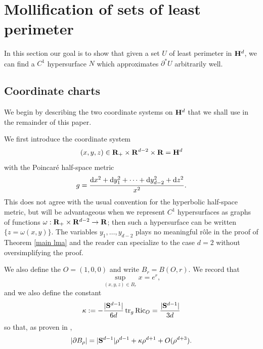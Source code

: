 \section{Mollification of sets of least perimeter}\label{MollifierSection}
In this section our goal is to show that given a set $U$ of least perimeter in $\mathbf H^d$, we can find a $C^1$ hypersurface $N$ which approximates $\partial^* U$ arbitrarily well.

\subsection{Coordinate charts}
We begin by describing the two coordinate systems on $\mathbf H^d$ that we shall use in the remainder of this paper.

We first introduce the coordinate system
$$(x, y, z) \in \mathbf{R}_+ \times \mathbf{R}^{d - 2} \times \mathbf{R} = \mathbf H^d$$
with the Poincar\'e half-space metric
\begin{equation}\label{hyperbolic metric}
g = \frac{\mathop{}\!\mathrm{d} x^2 + \mathop{}\!\mathrm{d} y_1^2 + \cdots + \mathop{}\!\mathrm{d} y_{d - 2}^2 + \mathop{}\!\mathrm{d} z^2}{x^2}.
\end{equation}
This does not agree with the usual convention for the hyperbolic half-space metric, but will be advantageous when we represent $C^1$ hypersurfaces as graphs of functions $\omega: \mathbf{R}_+ \times \mathbf{R}^{d - 2} \to \mathbf{R}$; then such a hypersurface can be written $\{z = \omega(x, y)\}$.
The variables $y_1, \dots, y_{d - 2}$ plays no meaningful r\^ole in the proof of Theorem \ref{main lma} and the reader can specialize to the case $d = 2$ without oversimplifying the proof.

We also define the  $O = (1, 0, 0)$ and write $B_r = B(O, r)$.
We record that
\begin{equation}\label{sup in a ball}
\sup_{(x, y, z) \in B_r} x = e^r,
\end{equation}
and we also define the constant
$$\kappa := -\frac{|\mathbf S^{d - 1}|}{6d} \operatorname{tr}_g \mathrm{Ric}_O = \frac{|\mathbf S^{d - 1}|}{3d}$$
so that, as proven in \cite{gray1974volume},
\begin{equation}\label{area of sphere form}
|\partial B_\rho| = |\mathbf S^{d - 1}|\rho^{d - 1} + \kappa \rho^{d + 1} + O(\rho^{d + 3}).
\end{equation}

